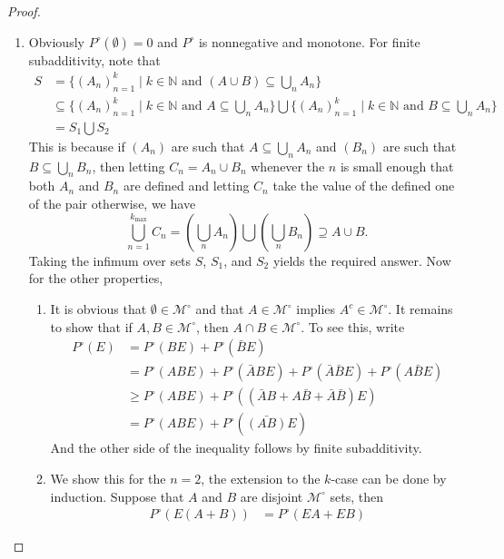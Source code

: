 \documentclass[11pt]{article}
\newcommand\br[1]{\left ( #1 \right )}
\newcommand{\N}{\mathbb{N}}
\newcommand{\M}{\mathcal{M}}
\newcommand{\seq}{\subseteq}
\newcommand{\es}{\emptyset}
\newcommand{\mc}{\mathcal}
\newcommand{\un}{\cup}
\newcommand{\ic}{\cap}
\begin{document}
\begin{proof}
    \begin{enumerate}
        \item Obviously $P^{\circ} (\es) = 0$ and $P^\circ$ is nonnegative and monotone. For finite subadditivity, note that
        \begin{align*}
            S &= \{ (A_n)_{n=1}^{k} \mid k \in \N \text { and } (A \un B) \seq \bigcup_n A_n \} \\
            &\seq \{  (A_n)_{n=1}^{k} \mid k \in \N \text { and } A \seq \bigcup_n A_n \} \bigcup \{  (A_n)_{n=1}^{k} \mid k \in \N \text { and } B \seq \bigcup_n A_n \} \\
            &= S_1 \bigcup S_2
        \end{align*}
        This is because if $(A_n)$ are such that $A \seq \bigcup_n A_n$ and $(B_n)$ are such that $B \seq \bigcup_n B_n$, then letting $C_n = A_n \cup B_n$ whenever the $n$ is small enough that both $A_n$ and $B_n$ are defined and letting $C_n$ take the value of the defined one of the pair otherwise, we have
        \[ \bigcup_{n=1}^{k_{\max}} C_n = \br{\bigcup_n A_n} \bigcup \br{\bigcup_n B_n} \supseteq A \cup B. \]
        Taking the infimum over sets $S$, $S_1$, and $S_2$ yields the required answer. Now for the other properties,
        \begin{enumerate}
            \item It is obvious that $\es \in \mc{M}^\circ$ and that $A \in \mc{M}^\circ$ implies $A^{c} \in \mc{M}^\circ$. It remains to show that if $A, B \in \M^\circ$, then $A \ic B \in \M^{\circ}$. To see this, write
            \begin{align*}
                P^{\circ} (E) &= P^\circ (BE) + P^\circ (\bar{B} E) \\
                &= P^\circ (ABE) + P^\circ (\bar{A} BE) + P^\circ(\bar{A} \bar{B} E) + P^\circ (A \bar{B} E) \\
                &\geq P^\circ (ABE) + P^\circ( (\bar{A}B + A \bar{B} + \bar{A} \bar{B}) E) \\
                &= P^\circ (ABE) + P^\circ ( \bar{(AB)} E)
            \end{align*}
            And the other side of the inequality follows by finite subadditivity.
            \item We show this for the $n = 2$, the extension to the $k$-case can be done by induction. Suppose that $A$ and $B$ are disjoint $\M^{\circ}$ sets, then
            \begin{align*}
                P^{\circ} (E(A + B)) &= P^{\circ} (EA + EB)

\end{align*}
\end{enumerate}
\end{enumerate}
\end{proof}
\end{document}

